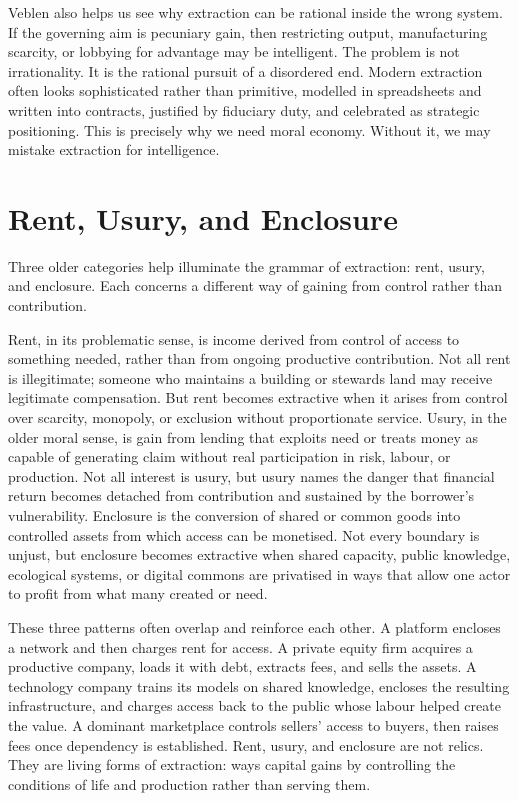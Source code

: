 \documentclass[11pt,a4paper,oneside]{book}
\begin{document}
Veblen also helps us see why extraction can be rational inside the wrong system. If the governing aim is pecuniary gain, then restricting output, manufacturing scarcity, or lobbying for advantage may be intelligent. The problem is not irrationality. It is the rational pursuit of a disordered end. Modern extraction often looks sophisticated rather than primitive, modelled in spreadsheets and written into contracts, justified by fiduciary duty, and celebrated as strategic positioning. This is precisely why we need moral economy. Without it, we may mistake extraction for intelligence.

\section*{Rent, Usury, and Enclosure}

Three older categories help illuminate the grammar of extraction: rent, usury, and enclosure. Each concerns a different way of gaining from control rather than contribution.

Rent, in its problematic sense, is income derived from control of access to something needed, rather than from ongoing productive contribution. Not all rent is illegitimate; someone who maintains a building or stewards land may receive legitimate compensation. But rent becomes extractive when it arises from control over scarcity, monopoly, or exclusion without proportionate service. Usury, in the older moral sense, is gain from lending that exploits need or treats money as capable of generating claim without real participation in risk, labour, or production. Not all interest is usury, but usury names the danger that financial return becomes detached from contribution and sustained by the borrower's vulnerability. Enclosure is the conversion of shared or common goods into controlled assets from which access can be monetised. Not every boundary is unjust, but enclosure becomes extractive when shared capacity, public knowledge, ecological systems, or digital commons are privatised in ways that allow one actor to profit from what many created or need.

These three patterns often overlap and reinforce each other. A platform encloses a network and then charges rent for access. A private equity firm acquires a productive company, loads it with debt, extracts fees, and sells the assets. A technology company trains its models on shared knowledge, encloses the resulting infrastructure, and charges access back to the public whose labour helped create the value. A dominant marketplace controls sellers' access to buyers, then raises fees once dependency is established. Rent, usury, and enclosure are not relics. They are living forms of extraction: ways capital gains by controlling the conditions of life and production rather than serving them.
\end{document}
